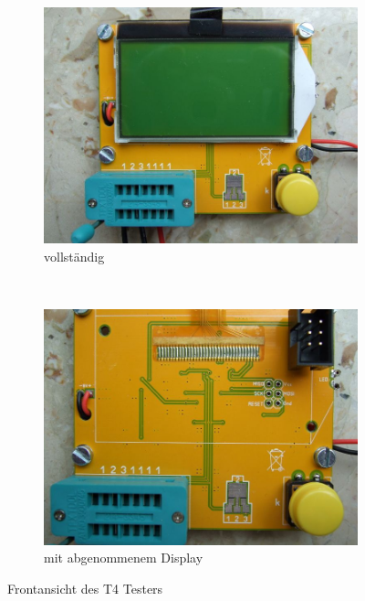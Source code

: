 \begin{figure}[H]
  \begin{subfigure}[b]{.5\textwidth}	%
    \centering
    \includegraphics[width=1.\textwidth]{../PNG/T4_front.JPG}	%
    \caption{vollständig}
  \end{subfigure}
~
  \begin{subfigure}[b]{.5\textwidth}	%
    \centering
    \includegraphics[width=1.\textwidth]{../PNG/T4_front_noLCD.JPG}	%
    \caption{mit abgenommenem Display}
  \end{subfigure}
  \caption{Frontansicht des T4 Testers}
\label{fig:T4_front}
\end{figure}

